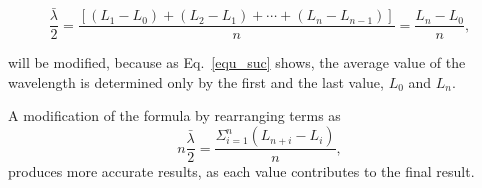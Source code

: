 \begin{equation}\label{equ_suc} 
\frac{\bar{\lambda}}{2}
=\frac{[(L_1-L_0)+(L_2-L_1)+\cdots+(L_n-L_{n-1})]}{n}
=\frac{L_n-L_0}{n},
\end{equation} 

will be modified, because as Eq.~\ref{equ_suc} shows, the average value of
the wavelength is determined only by the first and the last value, $L_0$ and
$L_n$. 

A modification of the formula by rearranging terms as
\begin{equation}\label{equ_suc}
    n\frac{\bar{\lambda}}{2}
    =\frac{\Sigma_{i=1}^{n}(L_{n+i}-L_i)}{n},
\end{equation}
produces more accurate results, as each value contributes to the final
result. 